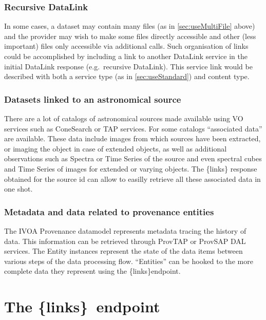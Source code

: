 \documentclass[11pt,a4paper]{ivoa}
\newcommand{\blinks}{\{links\}}
\begin{document}
\subsubsection{Recursive DataLink}

In some cases, a dataset may contain many files
(as in \ref{sec:useMultiFile} above)
and the provider may wish to make some files directly accessible and
other (less important) files only accessible via additional calls. Such
organisation of links could be accomplished by including a link to
another DataLink service in the initial DataLink response (e.g.\ recursive
DataLink). This service link would be described with both a service type
(as in \ref{sec:useStandard}) and content type.


\subsubsection{Datasets linked to an astronomical source}

There are  a lot of catalogs of astronomical sources made available
using VO services such as ConeSearch \citep{2008ivoa.specQ0222P} or TAP
services. For some catalogs ``associated data'' are available. These
data include images from which sources have been extracted, or imaging the
object in  case of extended objects, as well as additional observations
such as Spectra or Time Series of the source and even spectral cubes
and Time Series of images for extended or varying objects. The \blinks
response obtained for the source id can allow to easilly retrieve all
these associated data in one shot.

\subsubsection{Metadata and data related to provenance entities}

The IVOA Provenance datamodel \citep{pr:provdm} represents metadata
tracing  the history of data. This information can be retrieved through
ProvTAP \citep{iwd:provtap} or ProvSAP \citep{iwd:provsap}  DAL services.
The Entity instances represent  the state of the data items between
various steps of the data processing flow. ``Entities'' can be hooked
to the more complete data they represent using the \blinks endpoint.

\section{The \blinks~endpoint}
\end{document}
